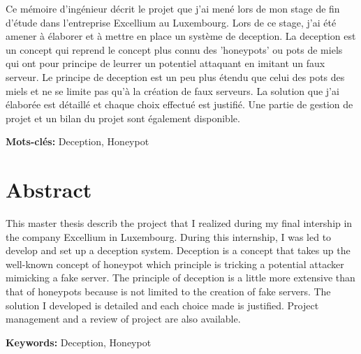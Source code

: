 \documentclass{tnreport}
\begin{document}
Ce mémoire d'ingénieur décrit le projet que j'ai mené lors de mon stage de fin d'étude dans l'entreprise Excellium au Luxembourg. Lors de ce stage, j'ai été amener à élaborer et à mettre en place un système de deception. La deception est un concept qui reprend le concept plus connu des 'honeypots' ou pots de miels qui ont pour principe de leurrer un potentiel attaquant en imitant un faux serveur. Le principe de deception est un peu plus étendu que celui des pots des miels et ne se limite pas qu'à la création de faux serveurs. La solution que j'ai élaborée est détaillé et chaque choix effectué est justifié. Une partie de gestion de projet et un bilan du projet sont également disponible.

{\bf Mots-clés:} Deception, Honeypot


\section*{Abstract}

This master thesis describ the project that I realized during my final intership in the company Excellium in Luxembourg. During this internship, I was led to develop and set up a deception system. Deception is a concept that takes up the well-known concept of honeypot which principle is tricking a potential attacker mimicking a fake server. The principle of deception is a little more extensive than that of honeypots because is not limited to the creation of fake servers. The solution I developed is detailed and each choice made is justified. Project management and a review of project are also available.



{\bf Keywords:} Deception, Honeypot 
\end{document}
